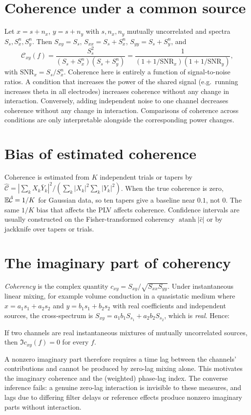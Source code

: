\section{Coherence under a common source}
Let $x=s+n_x$, $y=s+n_y$ with $s,n_x,n_y$ mutually uncorrelated and spectra $S_s,S_x^{n},S_y^{n}$. Then $S_{xy}=S_s$, $S_{xx}=S_s+S^n_x$, $S_{yy}=S_s+S^n_y$, and
\[
\mathcal C_{xy}(f)=\frac{S_s^2}{(S_s+S^n_x)(S_s+S^n_y)}=\frac{1}{(1+1/\mathrm{SNR}_x)(1+1/\mathrm{SNR}_y)},
\]
with $\mathrm{SNR}_x=S_s/S^n_x$. Coherence here is entirely a function of signal-to-noise ratios. A condition that increases the power of the shared signal (e.g.\ running increases theta in all electrodes) increases coherence without any change in interaction. Conversely, adding independent noise to one channel decreases coherence without any change in interaction. Comparisons of coherence across conditions are only interpretable alongside the corresponding power changes.

\section{Bias of estimated coherence}
Coherence is estimated from $K$ independent trials or tapers by $\hat{\mathcal C}=|\sum_kX_k\bar Y_k|^2/(\sum_k|X_k|^2\sum_k|Y_k|^2)$. When the true coherence is zero, $\mathbb E\hat{\mathcal C}=1/K$ for Gaussian data, so ten tapers give a baseline near $0.1$, not $0$. The same $1/K$ bias that affects the PLV affects coherence. Confidence intervals are usually constructed on the Fisher-transformed coherency $\operatorname{atanh}|\hat c|$ or by jackknife over tapers or trials.

\section{The imaginary part of coherency}
\emph{Coherency} is the complex quantity $c_{xy}=S_{xy}/\sqrt{S_{xx}S_{yy}}$. Under instantaneous linear mixing, for example volume conduction in a quasistatic medium where $x=a_1s_1+a_2s_2$ and $y=b_1s_1+b_2s_2$ with real coefficients and independent sources, the cross-spectrum is $S_{xy}=a_1b_1S_{s_1}+a_2b_2S_{s_2}$, which is \emph{real}. Hence:

\begin{proposition}
If two channels are real instantaneous mixtures of mutually uncorrelated sources, then $\Im c_{xy}(f)=0$ for every $f$.
\end{proposition}
A nonzero imaginary part therefore requires a time lag between the channels' contributions and cannot be produced by zero-lag mixing alone. This motivates the imaginary coherence and the (weighted) phase-lag index. The converse inference fails: a genuine zero-lag interaction is invisible to these measures, and lags due to differing filter delays or reference effects produce nonzero imaginary parts without interaction.

